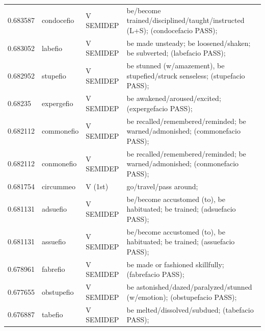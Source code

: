 \documentclass[]{article}
\begin{document}
\begin{table}
\begin{tabular}{l|lll}
	   0.683587 & condocefio & V SEMIDEP & be/become trained/disciplined/taught/instructed (L+S); (condocefacio PASS);\\
	   0.683052 & labefio & V SEMIDEP & be made unsteady; be loosened/shaken; be subverted; (labefacio PASS);\\
	   0.682952 & stupefio & V SEMIDEP & be stunned (w/amazement), be stupefied/struck senseless; (stupefacio PASS);\\
	   0.68235 & expergefio & V SEMIDEP & be awakened/aroused/excited; (expergefacio PASS);\\
	   0.682112 & commonefio & V SEMIDEP & be recalled/remembered/reminded; be warned/admonished; (commonefacio PASS);\\
	   0.682112 & conmonefio & V SEMIDEP & be recalled/remembered/reminded; be warned/admonished; (conmonefacio PASS);\\
	   0.681754 & circummeo & V (1st) & go/travel/pass around;\\
	   0.681131 & adsuefio & V SEMIDEP & be/become accustomed (to), be habituated; be trained; (adsuefacio PASS);\\
	   0.681131 & assuefio & V SEMIDEP & be/become accustomed (to), be habituated; be trained; (assuefacio PASS);\\
	   0.678961 & fabrefio & V SEMIDEP & be made or fashioned skillfully; (fabrefacio PASS);\\
	   0.677655 & obstupefio & V SEMIDEP & be astonished/dazed/paralyzed/stunned (w/emotion); (obstupefacio PASS);\\
	   0.676887 & tabefio & V SEMIDEP & be melted/dissolved/subdued; (tabefacio PASS);\\
	\end{tabular}
	\end{table}
\end{document}
